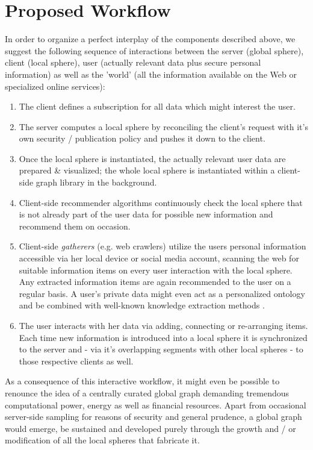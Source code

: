 \documentclass{llncs}
\begin{document}

\section{Proposed Workflow}
\label{sect:workflow}

In order to organize a perfect interplay of the components described above, we suggest the following sequence of interactions between the server (global sphere), client (local sphere), user (actually relevant data plus secure personal information) as well as the 'world' (all the information available on the Web or specialized online services):

\begin{enumerate}
	\item The client defines a subscription for all data which might interest the user.
	\item The server computes a local sphere by reconciling the client's request with it's own security / publication policy and pushes it down to the client.
	\item Once the local sphere is instantiated, the actually relevant user data are prepared \& visualized; the whole local sphere is instantiated within a client-side graph library in the background.
	\item Client-side recommender algorithms continuously check the local sphere that is not already part of the user data for possible new information and recommend them on occasion.
	\item Client-side \textit{gatherers} (e.g. web crawlers) utilize the users personal information accessible via her local device or social media account, scanning the web for suitable information items on every user interaction with the local sphere. Any extracted information items are again recommended to the user on a regular basis. A user's private data might even act as a personalized ontology and be combined with well-known knowledge extraction methods \cite{2003automaticKEfromWebDocuments}.
	\item The user interacts with her data via adding, connecting or re-arranging items. Each time new information is introduced into a local sphere it is synchronized to the server and - via it's overlapping segments with other local spheres - to those respective clients as well.
\end{enumerate}

As a consequence of this interactive workflow, it might even be possible to renounce the idea of a centrally curated global graph demanding tremendous computational power, energy as well as financial resources. Apart from occasional server-side sampling for reasons of security and general prudence, a global graph would emerge, be sustained and developed purely through the growth and / or modification of all the local spheres that fabricate it.
\end{document}
